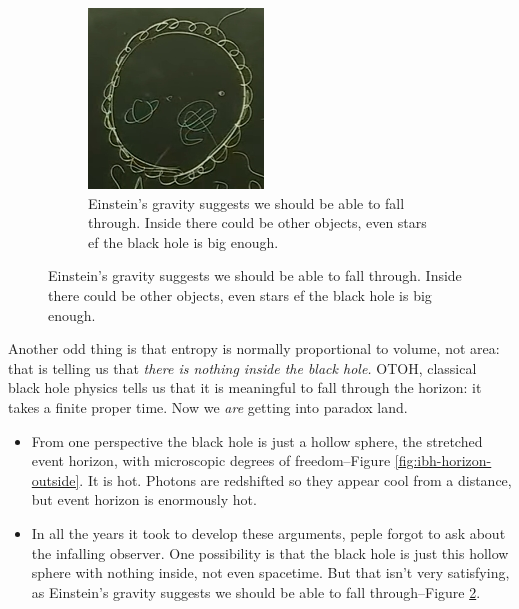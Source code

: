 \documentclass[]{article}
\begin{document}
{\begin{appendices}
\begin{figure}[H]
\begin{center}
\begin{subfigure}[t]{0.45\textwidth}
			\end{subfigure}
			\;
			\begin{subfigure}[t]{0.45\textwidth}
				\caption{Einstein's gravity suggests we should be able to fall through. Inside there could be other objects, even stars ef the black hole is big enough.}\label{fig:ibh-horizon-inside}
				\includegraphics[width=\textwidth]{ibh-horizon-inside}
		\end{subfigure}
		\end{center}
	\end{figure}
	Another odd thing is that entropy is normally proportional to volume, not area: that is telling us that \emph{there is nothing inside the black hole.}
	OTOH, classical black hole physics tells us that it is meaningful to fall through the horizon: it takes a finite proper time. Now we \emph{are} getting into paradox land.
	\begin{itemize}
		\item From one perspective the black hole is just a hollow sphere, the stretched event horizon, with microscopic degrees of freedom--Figure \ref{fig:ibh-horizon-outside}. It is hot. Photons are redshifted so they appear cool from a distance, but event horizon is enormously hot.
		\item In all the years it took to develop these arguments, peple forgot to ask about the infalling observer. One possibility is that the black hole is just this hollow sphere with nothing inside, not even spacetime. But that isn't very satisfying, as Einstein's gravity suggests we should be able to fall through--Figure \ref{fig:ibh-horizon-inside}.
	\end{itemize}


\end{appendices}}
\end{document}
